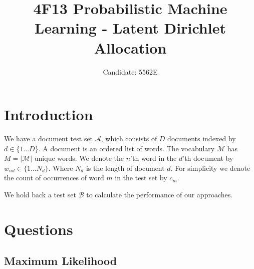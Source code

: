 \documentclass[]{article}
\title{4F13 Probabilistic Machine Learning - Latent Dirichlet Allocation}
\author{Candidate: 5562E}
\newcommand{\Acal}{\mathcal{A}}
\newcommand{\Bcal}{\mathcal{B}}
\newcommand{\Mcal}{\mathcal{M}}
\begin{document}


\setcounter{page}{1}
\maketitle

\tableofcontents

\section{Introduction}

We have a document test set $\Acal$, which consists of $D$ documents indexed by $d \in \{1 \dots D\}$. A document is an ordered list of words. The vocabulary $\Mcal$ has $M=|\Mcal|$ unique words. We denote the $n$'th word in the $d$'th document by $w_{nd} \in \{1 \dots N_d\}$. Where $N_d$ is the length of document $d$. For simplicity we denote the count of occurrences of word $m$ in the test set by $c_m$.

We hold back a test set $\Bcal$ to calculate the performance of our approaches.

\section{Questions}
\subsection{Maximum Likelihood}
\end{document}
